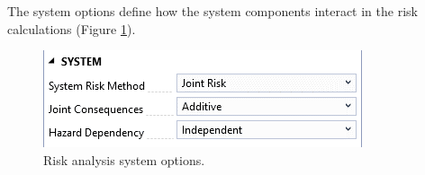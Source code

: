\documentclass[
]{book}
\begin{document}
The system options define how the system components interact in the risk calculations (Figure \ref{fig:figure-129}).

\begin{figure}

{\centering \includegraphics{images/figure129} 

}

\caption{Risk analysis system options.}\label{fig:figure-129}
\end{figure}
\end{document}
